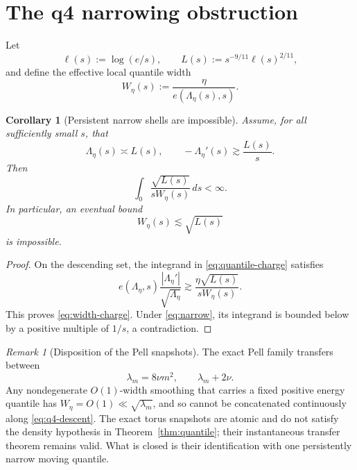 \documentclass[11pt]{article}
\newtheorem{corollary}[theorem]{Corollary}
\theoremstyle{remark}
\newtheorem{remark}[theorem]{Remark}
\begin{document}
\section{The q4 narrowing obstruction}

Let
\begin{equation}
\label{eq:L}
 \ell(s):=\log(e/s),
 \qquad
 L(s):=s^{-9/11}\ell(s)^{2/11},
\end{equation}
and define the effective local quantile width
\begin{equation}
\label{eq:W}
 W_\eta(s):=\frac{\eta}{e(\Lambda_\eta(s),s)}.
\end{equation}

\begin{corollary}[Persistent narrow shells are impossible]
\label{cor:narrow}
Assume, for all sufficiently small \(s\), that
\begin{equation}
\label{eq:q4-descent}
 \Lambda_\eta(s)\asymp L(s),
 \qquad
 -\Lambda_\eta'(s)\gtrsim\frac{L(s)}s.
\end{equation}
Then
\begin{equation}
\label{eq:width-charge}
 \int_0
 \frac{\sqrt{L(s)}}{sW_\eta(s)}\,ds<\infty.
\end{equation}
In particular, an eventual bound
\begin{equation}
\label{eq:narrow}
 W_\eta(s)\lesssim\sqrt{L(s)}
\end{equation}
is impossible.
\end{corollary}

\begin{proof}
On the descending set, the integrand in
\eqref{eq:quantile-charge} satisfies
\[
 e(\Lambda_\eta,s)
 \frac{|\Lambda_\eta'|}{\sqrt{\Lambda_\eta}}
 \gtrsim
 \frac{\eta\sqrt{L(s)}}{sW_\eta(s)}.
\]
This proves \eqref{eq:width-charge}.  Under \eqref{eq:narrow}, its
integrand is bounded below by a positive multiple of \(1/s\), a
contradiction.
\end{proof}

\begin{remark}[Disposition of the Pell snapshots]
The exact Pell family transfers between
\[
 \lambda_m=8\nu m^2,
 \qquad
 \lambda_m+2\nu.
\]
Any nondegenerate \(O(1)\)-width smoothing that carries a fixed positive
energy quantile has \(W_\eta=O(1)\ll\sqrt{\lambda_m}\), and so cannot be
concatenated continuously along \eqref{eq:q4-descent}.  The exact torus
snapshots are atomic and do not satisfy the density hypothesis in
Theorem~\ref{thm:quantile}; their instantaneous transfer theorem remains
valid.  What is closed is their identification with one persistently
narrow moving quantile.
\end{remark}
\end{document}
